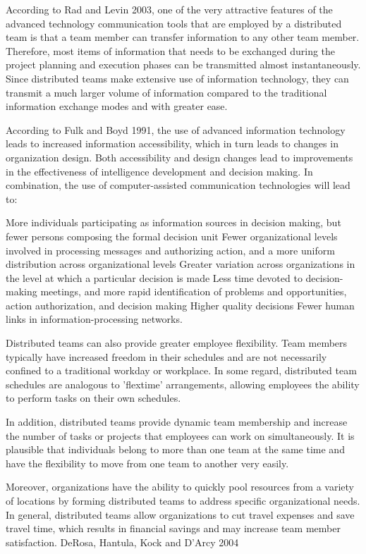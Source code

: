 According to Rad and Levin 2003, one of the very attractive features of the advanced technology communication tools that are employed by a distributed team is that a team member can transfer information to any other team member. Therefore, most items of information that needs to be exchanged during the project planning and execution phases can be transmitted almost instantaneously. Since distributed teams make extensive use of information technology, they can transmit a much larger volume of information compared to the traditional information exchange modes and with greater ease.

According to Fulk and Boyd 1991, the use of advanced information technology leads to increased information accessibility, which in turn leads to changes in organization design. Both accessibility and design changes lead to improvements in the effectiveness of intelligence development and decision making. In combination, the use of computer-assisted communication technologies will lead to:

More individuals participating as information sources in decision making, but fewer persons composing the formal decision unit
Fewer organizational levels involved in processing messages and authorizing action, and a more uniform distribution across organizational levels
Greater variation across organizations in the level at which a particular decision is made
Less time devoted to decision-making meetings, and more rapid identification of problems and opportunities, action authorization, and decision making
Higher quality decisions
Fewer human links in information-processing networks.

Distributed teams can also provide greater employee flexibility. Team members typically have increased freedom in their schedules and are not necessarily confined to a traditional workday or workplace. In some regard, distributed team schedules are analogous to 'flextime' arrangements, allowing employees the ability to perform tasks on their own schedules.
 
In addition, distributed teams provide dynamic team membership and increase the number of tasks or projects that employees can work on simultaneously. It is plausible that individuals belong to more than one team at the same time and have the flexibility to move from one team to another very easily.

Moreover, organizations have the ability to quickly pool resources from a variety of locations by forming distributed teams to address specific organizational needs. In general, distributed teams allow organizations to cut travel expenses and save travel time, which results in financial savings and may increase team member satisfaction. DeRosa, Hantula, Kock and D'Arcy 2004

